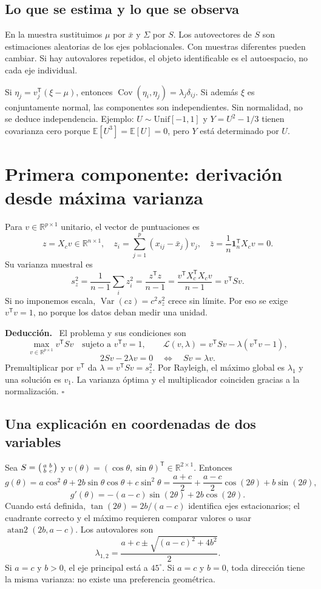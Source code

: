 \documentclass[11pt,a4paper]{article}
\newcommand{\R}{\mathbb R}
\newcommand{\E}{\mathbb E}
\newcommand{\T}{^{\mathsf T}}
\DeclareMathOperator{\Var}{Var}
\DeclareMathOperator{\Cov}{Cov}
\newenvironment{deduccion}{\par\textbf{Deducción.}\ }{\hfill$\square$\par}
\newcommand{\ones}{\mathbf 1}
\theoremstyle{definition}
\begin{document}
\subsection{Lo que se estima y lo que se observa}
En la muestra sustituimos $\mu$ por $\bar x$ y $\Sigma$ por $S$. Los autovectores de $S$ son estimaciones aleatorias de los ejes poblacionales. Con muestras diferentes pueden cambiar. Si hay autovalores repetidos, el objeto identificable es el autoespacio, no cada eje individual.
\begin{cuidado}
Si $\eta_j=v_j\T(\xi-\mu)$, entonces $\Cov(\eta_i,\eta_j)=\lambda_j\delta_{ij}$. Si además $\xi$ es conjuntamente normal, las componentes son independientes. Sin normalidad, no se deduce independencia. Ejemplo: $U\sim\mathrm{Unif}[-1,1]$ y $Y=U^2-1/3$ tienen covarianza cero porque $\E[U^3]=\E[U]=0$, pero $Y$ está determinado por $U$.
\end{cuidado}

\section{Primera componente: derivación desde máxima varianza}
Para $v\in\R^{p\times1}$ unitario, el vector de puntuaciones es
\[
z=X_cv\in\R^{n\times1},\quad z_i=\sum_{j=1}^p(x_{ij}-\bar x_j)v_j,
\quad\bar z=\frac1n\ones_n\T X_cv=0.
\]
Su varianza muestral es
\[
s_z^2=\frac1{n-1}\sum_i z_i^2=\frac{z\T z}{n-1}
=\frac{v\T X_c\T X_cv}{n-1}=v\T Sv.
\]
Si no imponemos escala, $\Var(cz)=c^2s_z^2$ crece sin límite. Por eso se exige $v\T v=1$, no porque los datos deban medir una unidad.
\begin{deduccion}
El problema y sus condiciones son
\[
\max_{v\in\R^{p\times1}}v\T Sv\quad\text{sujeto a }v\T v=1,\qquad
\mathcal L(v,\lambda)=v\T Sv-\lambda(v\T v-1),
\]
\[
2Sv-2\lambda v=0\quad\Longleftrightarrow\quad Sv=\lambda v.
\]
Premultiplicar por $v\T$ da $\lambda=v\T Sv=s_z^2$. Por Rayleigh, el máximo global es $\lambda_1$ y una solución es $v_1$. La varianza óptima y el multiplicador coinciden gracias a la normalización.
\end{deduccion}
\subsection{Una explicación en coordenadas de dos variables}
Sea $S=\begin{psmallmatrix}a&b\\b&c\end{psmallmatrix}$ y $v(\theta)=(\cos\theta,\sin\theta)\T\in\R^{2\times1}$. Entonces
\[
g(\theta)=a\cos^2\theta+2b\sin\theta\cos\theta+c\sin^2\theta
=\frac{a+c}2+\frac{a-c}2\cos(2\theta)+b\sin(2\theta),
\]
\[
g'(\theta)=-(a-c)\sin(2\theta)+2b\cos(2\theta).
\]
Cuando está definida, $\tan(2\theta)=2b/(a-c)$ identifica ejes estacionarios; el cuadrante correcto y el máximo requieren comparar valores o usar $\operatorname{atan2}(2b,a-c)$. Los autovalores son
\[
\lambda_{1,2}=\frac{a+c\pm\sqrt{(a-c)^2+4b^2}}2.
\]
Si $a=c$ y $b>0$, el eje principal está a $45^\circ$. Si $a=c$ y $b=0$, toda dirección tiene la misma varianza: no existe una preferencia geométrica.
\end{document}
